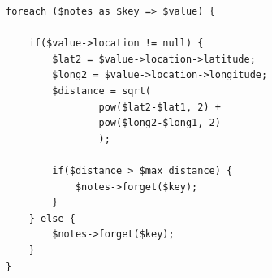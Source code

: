 \begin{lstlisting}[caption={Gestione query string}]
foreach ($notes as $key => $value) {

	if($value->location != null) {
		$lat2 = $value->location->latitude;
		$long2 = $value->location->longitude;
		$distance = sqrt(
				pow($lat2-$lat1, 2) +
			 	pow($long2-$long1, 2)
			 	);

		if($distance > $max_distance) {
			$notes->forget($key);
		}    
	} else {
		$notes->forget($key);
	}
}
\end{lstlisting}

